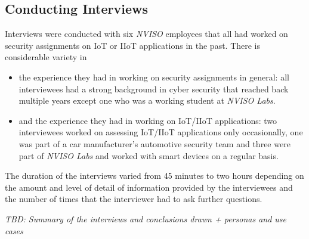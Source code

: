\subsection{Conducting Interviews}
Interviews were conducted with six %
\emph{NVISO} employees that all had worked on security assignments on \ac{IoT} or \ac{IIoT} applications in the past. There is considerable variety in
\begin{itemize}
    \item the experience they had in working on security assignments in general: all interviewees had a strong background in cyber security that reached back multiple years except one who was a working student at \emph{NVISO Labs}.
    \item and the experience they had in working on \ac{IoT}/\ac{IIoT} applications: two interviewees worked on assessing \ac{IoT}/\ac{IIoT} applications only occasionally, one was part of a car manufacturer's automotive security team and three were part of \emph{NVISO Labs} and worked with smart devices on a regular basis.
\end{itemize}
The duration of the interviews varied from 45 minutes to two hours depending on the amount and level of detail of information provided by the interviewees and the number of times that the interviewer had to ask further questions.

\emph{TBD: Summary of the interviews and conclusions drawn + personas and use cases}

